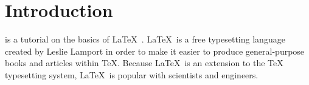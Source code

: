 \documentclass[12pt,journal,compsoc]{IEEEtran}
\begin{document}
\section{Introduction}
%
%



% 
% 
% 
% 

 is a tutorial on the basics of \LaTeX\ . \LaTeX\ is a free typesetting language created by Leslie Lamport in order to make it easier to produce general-purpose books and articles within TeX. Because \LaTeX\ is an extension to the TeX typesetting system, \LaTeX\ is popular with scientists and engineers.
 
\end{document}

